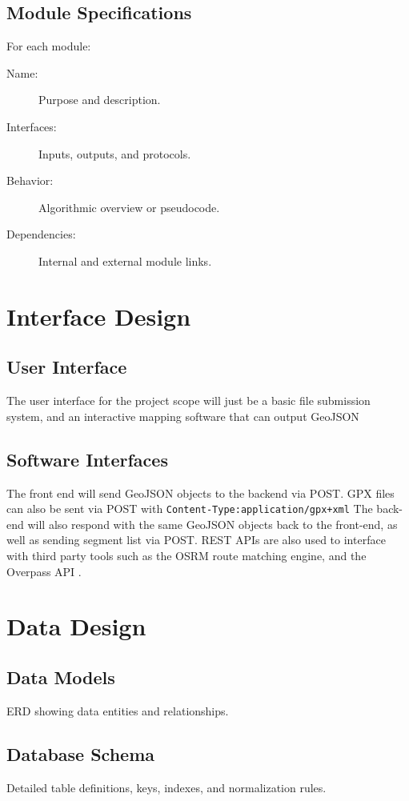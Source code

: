 \documentclass[11pt,twoside]{report}
\begin{document}
\subsection{Module Specifications}
For each module:
\begin{description}
	\item[Name:] Purpose and description.
	\item[Interfaces:] Inputs, outputs, and protocols.
	\item[Behavior:] Algorithmic overview or pseudocode.
	\item[Dependencies:] Internal and external module links.
\end{description}

\section{Interface Design}
\subsection{User Interface}
The user interface for the project scope will just be a basic file submission system, and an interactive mapping software that can output GeoJSON
\subsection{Software Interfaces}
The front end will send GeoJSON objects to the backend via POST. GPX files can also be sent via POST with \texttt{\small Content-Type:application/gpx+xml}
The back-end will also respond with the same GeoJSON objects back to the front-end, as well as sending segment list via POST.
REST APIs are also used to interface with third party tools such as the OSRM \citep{Luxen2011} route matching engine, and the Overpass API \citep{OverpassAPI}.

\section{Data Design}
\subsection{Data Models}
ERD showing data entities and relationships.

\subsection{Database Schema}
Detailed table definitions, keys, indexes, and normalization rules.
\end{document}
